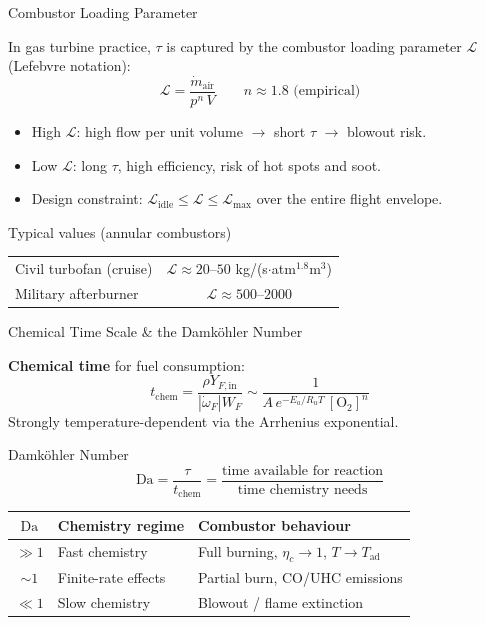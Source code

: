 \documentclass[12pt,aspectratio=169]{beamer}
\newcommand{\taures}{\tau}
\newcommand{\tchem}{t_{\text{chem}}}
\newcommand{\Da}{\mathrm{Da}}
\newcommand{\Vr}{V}
\newcommand{\Tad}{T_{\text{ad}}}
\newcommand{\mdot}{\dot{m}}
\begin{document}
\begin{frame}{Combustor Loading Parameter}

  In gas turbine practice, $\taures$ is captured by the
  \alert{combustor loading parameter} $\mathcal{L}$
  (Lefebvre notation):
  \[
    \mathcal{L} = \frac{\mdot_{\text{air}}}{p^n\,\Vr}
    \qquad n \approx 1.8 \text{ (empirical)}
  \]

  \begin{itemize}
    \item High $\mathcal{L}$: high flow per unit volume $\to$ short $\taures$
          $\to$ blowout risk.
    \item Low $\mathcal{L}$: long $\taures$, high efficiency, risk of hot spots
          and soot.
    \item Design constraint: $\mathcal{L}_{\text{idle}} \leq \mathcal{L}
          \leq \mathcal{L}_{\text{max}}$ over the entire flight envelope.
  \end{itemize}

  \begin{exampleblock}{Typical values (annular combustors)}
    \begin{tabular}{lc}
      Civil turbofan (cruise) & $\mathcal{L} \approx 20$--$50$ kg/(s$\cdot$atm$^{1.8}$m$^3$)\\
      Military afterburner    & $\mathcal{L} \approx 500$--$2000$ \\
    \end{tabular}
  \end{exampleblock}
\end{frame}

\begin{frame}{Chemical Time Scale \& the Damk\"{o}hler Number}

  \textbf{Chemical time} for fuel consumption:
  \[
    \tchem = \frac{\rho Y_{F,\text{in}}}{|\dot{\omega}_F| W_F}
    \sim \frac{1}{A\,e^{-E_a/R_u T}\,[\text{O}_2]^n}
  \]
  Strongly temperature-dependent via the Arrhenius exponential.

  \medskip
  \begin{block}{Damk\"{o}hler Number}
    \[
      \Da = \frac{\taures}{\tchem}
      = \frac{\text{time available for reaction}}{\text{time chemistry needs}}
    \]
  \end{block}

  \begin{center}
  \renewcommand{\arraystretch}{1.3}
  \begin{tabular}{cll}
    \toprule
    $\Da$ & Chemistry regime & Combustor behaviour \\
    \midrule
    $\gg 1$ & Fast chemistry & Full burning, $\eta_c \to 1$, $T \to \Tad$ \\
    $\sim 1$ & Finite-rate effects & Partial burn, CO/UHC emissions \\
    $\ll 1$ & Slow chemistry & \alert{Blowout / flame extinction} \\
    \bottomrule
  \end{tabular}
  \end{center}
\end{frame}
\end{document}
